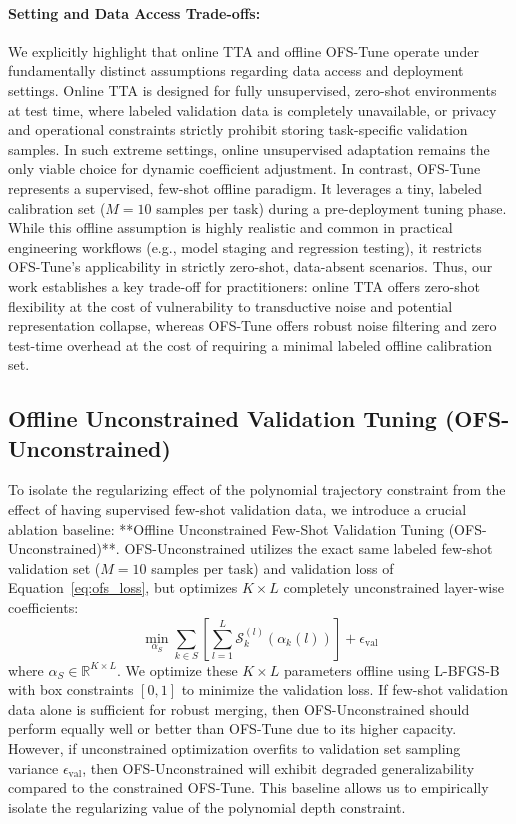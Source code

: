 \paragraph{Setting and Data Access Trade-offs:}
We explicitly highlight that online TTA and offline OFS-Tune operate under fundamentally distinct assumptions regarding data access and deployment settings.
Online TTA is designed for fully unsupervised, zero-shot environments at test time, where labeled validation data is completely unavailable, or privacy and operational constraints strictly prohibit storing task-specific validation samples.
In such extreme settings, online unsupervised adaptation remains the only viable choice for dynamic coefficient adjustment.
In contrast, OFS-Tune represents a supervised, few-shot offline paradigm.
It leverages a tiny, labeled calibration set ($M=10$ samples per task) during a pre-deployment tuning phase.
While this offline assumption is highly realistic and common in practical engineering workflows (e.g., model staging and regression testing), it restricts OFS-Tune's applicability in strictly zero-shot, data-absent scenarios.
Thus, our work establishes a key trade-off for practitioners: online TTA offers zero-shot flexibility at the cost of vulnerability to transductive noise and potential representation collapse, whereas OFS-Tune offers robust noise filtering and zero test-time overhead at the cost of requiring a minimal labeled offline calibration set.

\subsection{Offline Unconstrained Validation Tuning (OFS-Unconstrained)}
To isolate the regularizing effect of the polynomial trajectory constraint from the effect of having supervised few-shot validation data, we introduce a crucial ablation baseline: **Offline Unconstrained Few-Shot Validation Tuning (OFS-Unconstrained)**.
OFS-Unconstrained utilizes the exact same labeled few-shot validation set ($M=10$ samples per task) and validation loss of Equation~\ref{eq:ofs_loss}, but optimizes $K \times L$ completely unconstrained layer-wise coefficients:
\begin{equation}
\label{eq:ofs_unc_loss}
\min_{\alpha_S} \sum_{k \in S} \left[ \sum_{l=1}^L \mathcal{S}_k^{(l)}\left(\alpha_k(l)\right) \right] + \epsilon_{\text{val}}
\end{equation}
where $\alpha_S \in \mathbb{R}^{K \times L}$.
We optimize these $K \times L$ parameters offline using L-BFGS-B with box constraints $[0, 1]$ to minimize the validation loss.
If few-shot validation data alone is sufficient for robust merging, then OFS-Unconstrained should perform equally well or better than OFS-Tune due to its higher capacity.
However, if unconstrained optimization overfits to validation set sampling variance $\epsilon_{\text{val}}$, then OFS-Unconstrained will exhibit degraded generalizability compared to the constrained OFS-Tune.
This baseline allows us to empirically isolate the regularizing value of the polynomial depth constraint.

